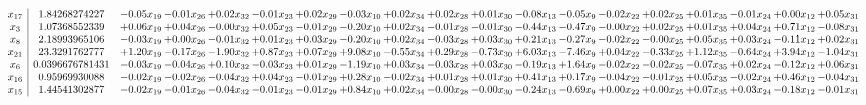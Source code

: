 \documentclass[9pt]{article}
\begin{document}
 \[\begin{array}{c| c c@{\hskip 2pt} c@{\hskip 2pt} c@{\hskip 2pt} c@{\hskip 2pt} c@{\hskip 2pt} c@{\hskip 2pt} c@{\hskip 2pt} c@{\hskip 2pt} c@{\hskip 2pt} c@{\hskip 2pt} c@{\hskip 2pt} c@{\hskip 2pt} c@{\hskip 2pt} c@{\hskip 2pt} c@{\hskip 2pt} c@{\hskip 2pt} c@{\hskip 2pt} }
 x_{17}   &  1.84268274227 & -0.05 x_{19} & -0.01 x_{26} & +  0.02 x_{32} & -0.01 x_{23} & +  0.02 x_{29} & -0.03 x_{10} & +  0.02 x_{34} & +  0.02 x_{28} & +  0.01 x_{30} & -0.08 x_{13} & -0.05 x_{9} & -0.02 x_{22} & +  0.02 x_{25} & +  0.01 x_{35} & -0.01 x_{24} & +  0.00 x_{12} & +  0.05 x_{31}\\
 x_{3}   &  1.07368552339 & +  0.06 x_{19} & +  0.04 x_{26} & -0.00 x_{32} & +  0.05 x_{23} & -0.01 x_{29} & -0.20 x_{10} & +  0.02 x_{34} & -0.01 x_{28} & -0.01 x_{30} & -0.44 x_{13} & -0.47 x_{9} & -0.00 x_{22} & +  0.02 x_{25} & +  0.01 x_{35} & +  0.04 x_{24} & +  0.71 x_{12} & -0.08 x_{31}\\
 x_{8}   &  2.18993965106 & -0.03 x_{19} & +  0.00 x_{26} & -0.01 x_{32} & +  0.01 x_{23} & +  0.03 x_{29} & -0.20 x_{10} & +  0.02 x_{34} & -0.03 x_{28} & +  0.03 x_{30} & +  0.21 x_{13} & -0.27 x_{9} & -0.02 x_{22} & -0.00 x_{25} & +  0.05 x_{35} & +  0.03 x_{24} & -0.11 x_{12} & +  0.02 x_{31}\\
 x_{21}   &  23.3291762777 & +  1.20 x_{19} & -0.17 x_{26} & -1.90 x_{32} & +  0.87 x_{23} & +  0.07 x_{29} & +  9.08 x_{10} & -0.55 x_{34} & +  0.29 x_{28} & -0.73 x_{30} & +  6.03 x_{13} & -7.46 x_{9} & +  0.04 x_{22} & -0.33 x_{25} & +  1.12 x_{35} & -0.64 x_{24} & +  3.94 x_{12} & -1.04 x_{31}\\
 x_{6}   &  0.0396676781431 & -0.03 x_{19} & -0.04 x_{26} & +  0.10 x_{32} & -0.03 x_{23} & +  0.01 x_{29} & -1.19 x_{10} & +  0.03 x_{34} & -0.03 x_{28} & +  0.03 x_{30} & -0.19 x_{13} & +  1.64 x_{9} & -0.02 x_{22} & -0.02 x_{25} & -0.07 x_{35} & +  0.02 x_{24} & -0.12 x_{12} & +  0.06 x_{31}\\
 x_{16}   &  0.95969930088 & -0.02 x_{19} & -0.02 x_{26} & -0.04 x_{32} & +  0.04 x_{23} & -0.01 x_{29} & +  0.28 x_{10} & -0.02 x_{34} & +  0.01 x_{28} & +  0.01 x_{30} & +  0.41 x_{13} & +  0.17 x_{9} & -0.04 x_{22} & -0.01 x_{25} & +  0.05 x_{35} & -0.02 x_{24} & +  0.46 x_{12} & -0.04 x_{31}\\
 x_{15}   &  1.44541302877 & -0.02 x_{19} & -0.01 x_{26} & -0.04 x_{32} & -0.01 x_{23} & -0.01 x_{29} & +  0.84 x_{10} & +  0.02 x_{34} & -0.00 x_{28} & -0.00 x_{30} & -0.24 x_{13} & -0.69 x_{9} & +  0.00 x_{22} & +  0.00 x_{25} & +  0.07 x_{35} & +  0.03 x_{24} & -0.18 x_{12} & -0.01 x_{31}\\

\end{array}\]
\end{document}
